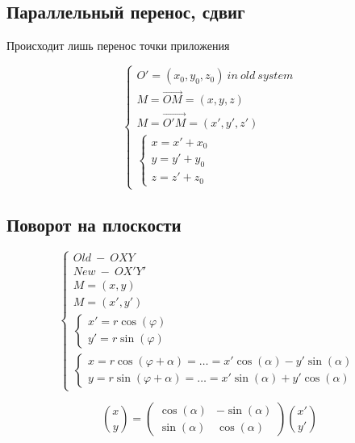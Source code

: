 \documentclass[12pt, a4paper]{article}
\begin{document}
    \subsection{Параллельный перенос, сдвиг}
    Происходит лишь перенос точки приложения

    \begin{equation}
        \begin{cases}
            O' = (x_0, y_0, z_0) ~ in ~ old ~ system \\ 
            M = \vec{OM} = (x, y, z) \\
            M = \vec{O'M} = (x', y', z') \\
            \begin{cases}
                x = x' + x_0 \\
                y = y' + y_0 \\
                z = z' + z_0
            \end{cases}
        \end{cases}
    \end{equation}

    \subsection{Поворот на плоскости}

    \begin{equation}
        \begin{cases}
            Old ~ - ~ OXY \\
            New ~ - ~ OX'Y' \\
            M = (x, y) \\
            M = (x', y') \\
            \begin{cases}
                x' = r \cos(\varphi) \\
                y' = r \sin(\varphi)
            \end{cases} \\
            \begin{cases}
                x = r \cos(\varphi + \alpha) = \ldots = x' \cos(\alpha) - y' \sin(\alpha) \\
                y = r \sin(\varphi + \alpha) = \ldots = x' \sin(\alpha) + y' \cos(\alpha)
            \end{cases}
        \end{cases}
    \end{equation}

    \begin{equation}
        \binom{x}{y} = \begin{pmatrix}
            \cos(\alpha) & -\sin(\alpha) \\
            \sin(\alpha) & \cos(\alpha)
        \end{pmatrix} \binom{x'}{y'}
    \end{equation}
    
\end{document}
